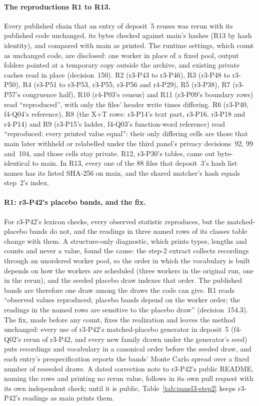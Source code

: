 \paragraph{The reproductions R1 to R13.} Every published chain that an entry of deposit~5 reuses was rerun with its
published code unchanged, its bytes checked against main's hashes (R13 by hash identity), and compared with main as
printed.
The runtime settings, which count as unchanged code, are disclosed: one worker in place of a fixed pool, output folders
pointed at a temporary copy outside the archive, and existing private caches read in place (decision~150). R2 (r3-P43
to r3-P46), R3 (r3-P48 to r3-P50), R4 (r3-P51 to r3-P53, r3-P55, r3-P56 and r4-P29), R5 (r3-P38), R7 (r3-P57's
congruence half), R10 (r4-P03's census) and R11 (r3-P09's boundary rows) read ``reproduced'', with only the files'
header write times differing. R6 (r3-P40, f4-Q04's reference), R8 (the X+T rows: r3-P14's text part, r3-P16, r3-P18 and
r4-P14) and R9 (r3-P15's ladder, f4-Q03's function-word reference) read ``reproduced: every printed value equal'': their
only differing cells are those that main later withheld or relabelled under the third panel's privacy decisions~92, 99
and~104, and those cells stay private. R12, r3-P30's tables, came out byte-identical to main. In R13, every one of the 88
files that deposit~3's hash list names has its listed SHA-256 on main, and the shared matcher's hash equals step~2's
index.

\paragraph{R1: r3-P42's placebo bands, and the fix.} For r3-P42's lexicon checks, every observed statistic reproduces,
but the matched-placebo bands do not, and the readings in three named rows of its classes table change with them. A
structure-only diagnostic, which prints types, lengths and counts and never a value, found the cause: the step-2 extract
collects recordings through an unordered worker pool, so the order in which the vocabulary is built depends on how the
workers are scheduled (three workers in the original run, one in the rerun), and the seeded placebo draw indexes that
order. The published bands are therefore one draw among the draws the code can give. R1 reads ``observed values
reproduced; placebo bands depend on the worker order; the readings in the named rows are sensitive to the placebo draw''
(decision~154.3). The fix, made before any count, fixes the realization and leaves the method unchanged: every use of
r3-P42's matched-placebo generator in deposit~5 (f4-Q02's rerun of r3-P42, and every new family drawn under the
generator's seed) puts recordings and vocabulary in a canonical order before the seeded draw, and each entry's
prespecification reports the bands' Monte Carlo spread over a fixed number of reseeded draws. A dated correction note to
r3-P42's public README, naming the rows and printing no rerun value, follows in its own pull request with its own
independent check; until it is public, Table~\ref{tab:panel3-step2} keeps r3-P42's readings as main prints them.

